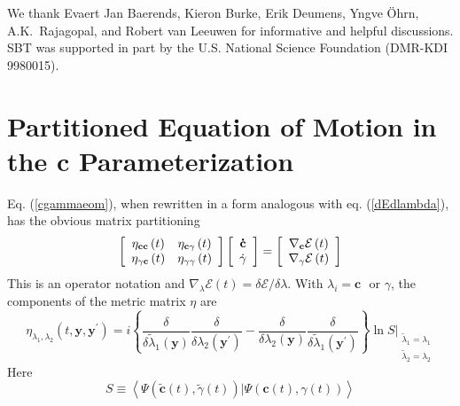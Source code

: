 \documentclass[aps,preprint]{revtex4}%
\begin{document}
We thank Evaert Jan Baerends, Kieron Burke, Erik Deumens, Yngve \"{O}hrn,
A.K.~Rajagopal, and Robert van Leeuwen for informative and helpful
discussions. SBT was supported in part by the U.S. National Science Foundation
(DMR-KDI 9980015).

\appendix


\section{Partitioned Equation of Motion in the $\mathbf{c}$ Parameterization}

Eq. (\ref{cgammaeom}), when rewritten in a form analogous with eq.
(\ref{dEdlambda}), has the obvious matrix partitioning
\begin{equation}
\left[
\begin{array}
[c]{cc}%
\eta_{\mathbf{cc}}\left(  t\right)  & \eta_{\mathbf{c}\gamma}\left(  t\right)
\\
\eta_{\gamma\mathbf{c}}\left(  t\right)  & \eta_{\gamma\gamma}\left(
t\right)
\end{array}
\right]  \left[
\begin{array}
[c]{c}%
\mathbf{\dot{c}}\\
\dot{\gamma}%
\end{array}
\right]  =\left[
\begin{array}
[c]{c}%
\nabla_{\mathbf{c}}\mathcal{E}\left(  t\right) \\
\nabla_{\gamma}\mathcal{E}\left(  t\right)
\end{array}
\right]  \label{partmat1}%
\end{equation}
This is an operator notation and $\nabla_{\lambda}\mathcal{E}\left(  t\right)
=\delta\mathcal{E}/\delta\lambda$. With $\lambda_{i}=\mathbf{c}\,${\ or
}$\gamma$, the components of the metric matrix $\eta$ are
\begin{equation}
\eta_{\lambda_{1},\lambda_{2}}(t,\mathbf{y},\mathbf{y}^{\prime})=i\left\{
\frac{\delta}{\delta\tilde{\lambda}_{1}(\mathbf{y})}\frac{\delta}%
{\delta\lambda_{2}(\mathbf{y}^{\prime})}-\frac{\delta}{\delta\lambda
_{2}(\mathbf{y})}\frac{\delta}{\delta\tilde{\lambda}_{1}(\mathbf{y}^{\prime}%
)}\right\}  \ln S| _{\substack{\tilde{\lambda}_{1}=\lambda_{1} \\\tilde
{\lambda}_{2}=\lambda_{2} }} \label{etamat}%
\end{equation}
Here
\begin{equation}
S\equiv\left\langle \Psi(\tilde{\mathbf{c}}(t),\tilde{\gamma}(t))|\Psi
(\mathbf{c}(t),\gamma(t))\right\rangle
\end{equation}
\end{document}
